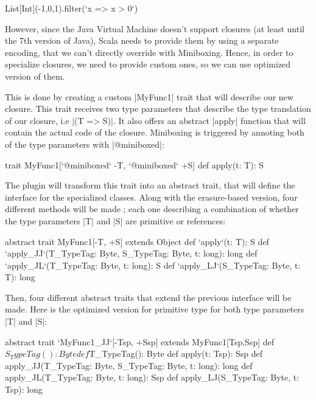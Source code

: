 \begin{lstlisting-nobreak}
 List[Int](-1,0,1).filter(`x => x > 0`)
\end{lstlisting-nobreak}

However, since the Java Virtual Machine doesn't support closures (at least until the 7th version of Java), Scala needs to provide them by using a separate encoding, that we can't directly override with Miniboxing. Hence, in order to specialize closures, we need to provide custom ones, so we can use optimized version of them.

This is done by creating a custom |MyFunc1| trait that will describe our new closure. This trait receives two type parameters that describe the type translation of our closure, i.e |(T => S)|. It also offers an abstract |apply| function that will contain the actual code of the closure. Miniboxing is triggered by annoting both of the type parameters with |@miniboxed|:

\begin{lstlisting-nobreak}
 trait MyFunc1[`@miniboxed` -T, `@miniboxed` +S] {
   def apply(t: T): S
 }
\end{lstlisting-nobreak}

The plugin will transform this trait into an abstract trait, that will define the interface for the specialized classes. Along with the erasure-based version, four different methods will be made ; each one describing a combination of whether the type parameters |T| and |S| are primitive or references:

\begin{lstlisting-nobreak}
  abstract trait MyFunc1[-T, +S] extends Object {
    def `apply`(t: T): S
    def `apply_JJ`(T_TypeTag: Byte,
        S_TypeTag: Byte, t: long): long
    def `apply_JL`(T_TypeTag: Byte, t: long): S
    def `apply_LJ`(S_TypeTag: Byte, t: T): long
  }
\end{lstlisting-nobreak}

Then, four different abstract traits that extend the previous interface will be made. Here is the optimized version for primitive type for both type parameters |T| and |S|:

\begin{lstlisting-nobreak}
  abstract trait `MyFunc1_JJ`[-Tsp, +Ssp] extends MyFunc1[Tsp,Ssp] {
    def $S_TypeTag(): Byte
    def $T_TypeTag(): Byte
    def apply(t: Tsp): Ssp
    def apply_JJ(T_TypeTag: Byte, S_TypeTag: Byte, t: long): long
    def apply_JL(T_TypeTag: Byte, t: long): Ssp
    def apply_LJ(S_TypeTag: Byte, t: Tsp): long
  }
  
\end{lstlisting-nobreak}


